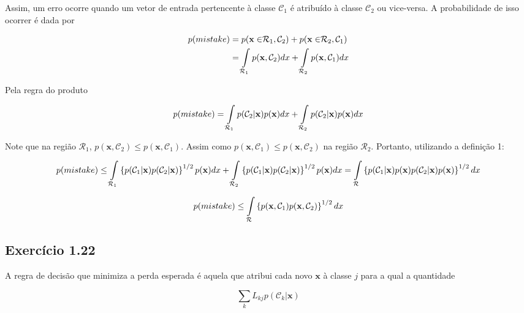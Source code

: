 \documentclass{article}
\begin{document}
  Assim, um erro ocorre quando um vetor de entrada pertencente à classe $\mathcal{C}_{1}$ é atribuído à classe $\mathcal{C}_{2}$ ou vice-versa. A probabilidade de isso ocorrer é dada por
  
  \begin{equation}
 	\begin{aligned}
  			p(mistake) & =  p(\mathbf{x\in}\mathcal{R}_{1},\mathcal{C}_{2})+p(\mathbf{x\in}\mathcal{R}_{2},\mathcal{C}_{1})  \\
  		     & = \intop_{\mathcal{R}_{1}}p(\mathbf{x},\mathcal{C}_{2})dx+\intop_{\mathcal{R}_{2}}p(\mathbf{x},\mathcal{C}_{1})dx
  		\end{aligned}                                                 
   \end{equation}
   
   Pela regra do produto 
   
    \[
    p(mistake) = \intop_{\mathcal{R}_{1}}p(\mathcal{C}_{2}|\mathbf{x})p(\mathbf{x})dx+\intop_{\mathcal{R}_{2}}p(\mathcal{C}_{2}|\mathbf{x})p(\mathbf{x})dx
    \]
    
  Note que na região $\mathcal{R}_{1}$, $p(\mathbf{x},\mathcal{C}_{2}) \leq p(\mathbf{x},\mathcal{C}_{1})$. Assim como $p(\mathbf{x},\mathcal{C}_{1}) \leq p(\mathbf{x},\mathcal{C}_{2})$ na região $\mathcal{R}_{2}$. Portanto, utilizando a definição 1:
  
  \[
   p(mistake) \leq \intop_{\mathcal{R}_{1}} \left\{p(\mathcal{C}_{1}|\mathbf{x})p(\mathcal{C}_{2}|\mathbf{x})   \right\}^{1/2}p(\mathbf{x})dx+\intop_{\mathcal{R}_{2}} \left\{p(\mathcal{C}_{1}|\mathbf{x})p(\mathcal{C}_{2}|\mathbf{x})\right\}^{1/2} p(\mathbf{x})dx = \intop_{\mathcal{R}}\left\{p(\mathcal{C}_{1}|\mathbf{x})p(\mathbf{x})p(\mathcal{C}_{2}|\mathbf{x})p(\mathbf{x}) \right\}^{1/2}dx
  \]
  
  \[
   p(mistake) \leq \intop_{\mathcal{R}}\left\{p(\mathbf{x},\mathcal{C}_{1})p(\mathbf{x},\mathcal{C}_{2}) \right\}^{1/2}dx
  \]

\subsection{ Exerc\'icio 1.22}

 A regra de decisão que minimiza a perda esperada é aquela que atribui cada novo $\mathbf{x}$ à classe $j$ para a qual a quantidade
 
 \begin{equation}
 	\sum_{k}L_{kj}p(\mathcal{C}_{k}| \mathbf{x})                      
 \end{equation}
 
\end{document}
